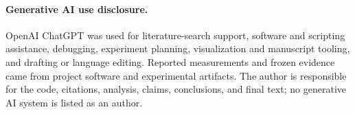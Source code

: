 \documentclass[acmtog,nonacm]{acmart}
\begin{document}
\paragraph{Generative AI use disclosure.}
OpenAI ChatGPT was used for literature-search support, software and scripting assistance, debugging, experiment planning, visualization and manuscript tooling, and drafting or language editing. Reported measurements and frozen evidence came from project software and experimental artifacts. The author is responsible for the code, citations, analysis, claims, conclusions, and final text; no generative AI system is listed as an author.



\end{document}
